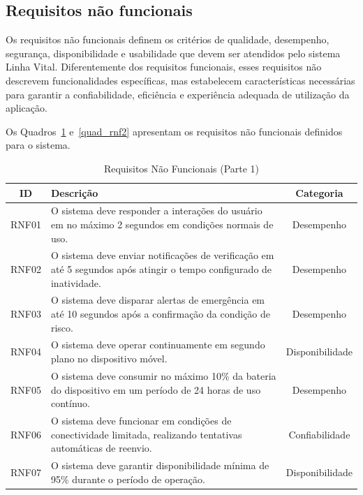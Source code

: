 \subsection{Requisitos não funcionais}

Os requisitos não funcionais definem os critérios de qualidade, desempenho, segurança, disponibilidade e usabilidade que devem ser atendidos pelo sistema Linha Vital. Diferentemente dos requisitos funcionais, esses requisitos não descrevem funcionalidades específicas, mas estabelecem características necessárias para garantir a confiabilidade, eficiência e experiência adequada de utilização da aplicação.

Os Quadros~\ref{quad_rnf1} e~\ref{quad_rnf2} apresentam os requisitos não funcionais definidos para o sistema.

\begin{table}[H]
\caption{Requisitos Não Funcionais (Parte 1)}
\label{quad_rnf1}
\centering

\begin{tabular}{|c|p{8cm}|c|}
\hline
\textbf{ID} & \textbf{Descrição} & \textbf{Categoria} \\
\hline

RNF01 &
O sistema deve responder a interações do usuário em no máximo 2 segundos em condições normais de uso. &
Desempenho \\
\hline

RNF02 &
O sistema deve enviar notificações de verificação em até 5 segundos após atingir o tempo configurado de inatividade. &
Desempenho \\
\hline

RNF03 &
O sistema deve disparar alertas de emergência em até 10 segundos após a confirmação da condição de risco. &
Desempenho \\
\hline

RNF04 &
O sistema deve operar continuamente em segundo plano no dispositivo móvel. &
Disponibilidade \\
\hline

RNF05 &
O sistema deve consumir no máximo 10\% da bateria do dispositivo em um período de 24 horas de uso contínuo. &
Desempenho \\
\hline

RNF06 &
O sistema deve funcionar em condições de conectividade limitada, realizando tentativas automáticas de reenvio. &
Confiabilidade \\
\hline

RNF07 &
O sistema deve garantir disponibilidade mínima de 95\% durante o período de operação. &
Disponibilidade \\
\hline


\end{tabular}
\end{table}
